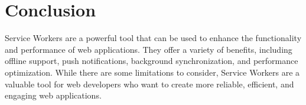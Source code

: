 \documentclass{report}
\begin{document}
\section{Conclusion}\label{Conclusion}
Service Workers are a powerful tool that can be used to enhance the functionality and performance of web applications. They offer a variety of benefits, including offline support, push notifications, background synchronization, and performance optimization. While there are some limitations to consider, Service Workers are a valuable tool for web developers who want to create more reliable, efficient, and engaging web applications.




%

\end{document}
